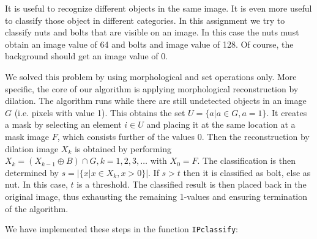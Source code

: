 It is useful to recognize different objects in the same image. It is even more useful to classify those object in different categories. In this assignment we try to classify nuts and bolts that are visible on an image. In this case the nuts must obtain an image value of 64 and bolts and image value of 128. Of course, the background should get an image value of 0.

We solved this problem by using morphological and set operations only. More specific, the core of our algorithm is applying morphological reconstruction by dilation. The algorithm runs while there are still undetected objects in an image $G$ (i.e. pixels with value 1). This obtains the set $U = \{a | a \in G, a = 1\}$. It creates a mask by selecting an element $i \in U$ and placing it at the same location at a mask image $F$, which consists further of the values 0. Then the reconstruction by dilation image $X_k$ is obtained by performing $X_k = (X_{k-1} \oplus B) \cap G, k = 1, 2, 3, \ldots$ with $X_0 = F$.
The classification is then determined by $s = |\{x | x \in X_k, x > 0\}|$. If $s > t$ then it is classified as bolt, else as nut. In this case, $t$ is a threshold. The classified result is then placed back in the original image, thus exhausting the remaining 1-values and ensuring termination of the algorithm.

We have implemented these steps in the function \texttt{IPclassify}: 

